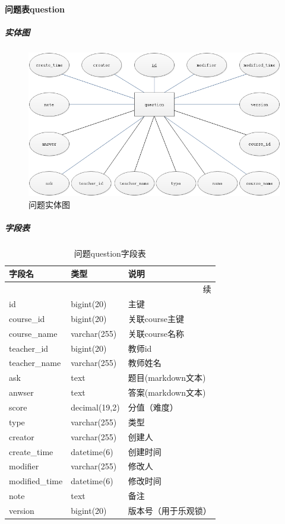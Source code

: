 \documentclass[titlepage,UTF8,linespread=1.5]{ctexart}
\begin{document}
\paragraph{问题表question}
\subparagraph{实体图}
\begin{figure}[H]
    \centering
    \includegraphics[width=140mm]{entity-question.png}
    \caption{问题实体图}
    \label{fig:entity-question}
\end{figure}
\subparagraph{字段表}
\begin{longtable}{|p{10em}|p{6em}|p{15em}|}
    \caption{问题question字段表}\label{tab:table_question} \\\hline
    字段名         & 类型          & 说明                  \\\hline
    \endfirsthead
    \multicolumn{3}{r}{{续\tablename\thetable{}}}          \\\hline
    \endhead
    id             & bigint(20)    & 主键                  \\\hline
    course\_id     & bigint(20)    & 关联course主键        \\\hline
    course\_name   & varchar(255)  & 关联course名称        \\\hline
    teacher\_id    & bigint(20)    & 教师id                \\\hline
    teacher\_name  & varchar(255)  & 教师姓名              \\\hline
    ask            & text          & 题目(markdown文本)    \\\hline
    anwser         & text          & 答案(markdown文本)    \\\hline
    score          & decimal(19,2) & 分值（难度）          \\\hline
    type           & varchar(255)  & 类型                  \\\hline
    creator        & varchar(255)  & 创建人                \\\hline
    create\_time   & datetime(6)   & 创建时间              \\\hline
    modifier       & varchar(255)  & 修改人                \\\hline
    modified\_time & datetime(6)   & 修改时间              \\\hline
    note           & text          & 备注                  \\\hline
    version        & bigint(20)    & 版本号（用于乐观锁）  \\\hline
\end{longtable}\par
\end{document}
